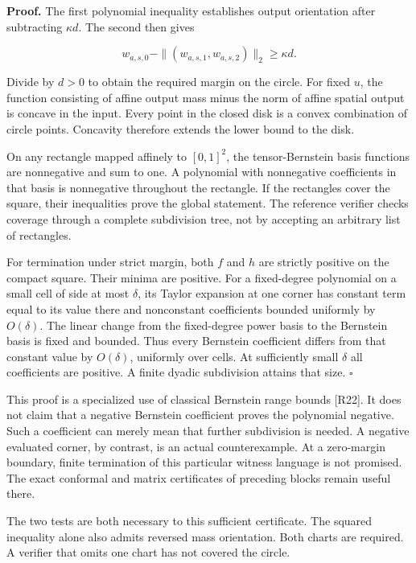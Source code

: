 \documentclass[11pt,letterpaper]{article}
\begin{document}
\textbf{Proof.} The first polynomial inequality establishes output
orientation after subtracting \(\kappa d\). The second then gives

\[
w_{a,s,0}-\|(w_{a,s,1},w_{a,s,2})\|_2\geq\kappa d.
\]

Divide by \(d>0\) to obtain the required margin on the circle. For fixed
\(u\), the function consisting of affine output mass minus the norm of
affine spatial output is concave in the input. Every point in the closed
disk is a convex combination of circle points. Concavity therefore
extends the lower bound to the disk.

On any rectangle mapped affinely to \([0,1]^2\), the tensor-Bernstein
basis functions are nonnegative and sum to one. A polynomial with
nonnegative coefficients in that basis is nonnegative throughout the
rectangle. If the rectangles cover the square, their inequalities prove
the global statement. The reference verifier checks coverage through a
complete subdivision tree, not by accepting an arbitrary list of
rectangles.

For termination under strict margin, both \(f\) and \(h\) are strictly
positive on the compact square. Their minima are positive. For a
fixed-degree polynomial on a small cell of side at most \(\delta\), its
Taylor expansion at one corner has constant term equal to its value
there and nonconstant coefficients bounded uniformly by \(O(\delta)\).
The linear change from the fixed-degree power basis to the Bernstein
basis is fixed and bounded. Thus every Bernstein coefficient differs
from that constant value by \(O(\delta)\), uniformly over cells. At
sufficiently small \(\delta\) all coefficients are positive. A finite
dyadic subdivision attains that size. \(\square\)

This proof is a specialized use of classical Bernstein range bounds
{[}R22{]}. It does not claim that a negative Bernstein coefficient
proves the polynomial negative. Such a coefficient can merely mean that
further subdivision is needed. A negative evaluated corner, by contrast,
is an actual counterexample. At a zero-margin boundary, finite
termination of this particular witness language is not promised. The
exact conformal and matrix certificates of preceding blocks remain
useful there.

The two tests are both necessary to this sufficient certificate. The
squared inequality alone also admits reversed mass orientation. Both
charts are required. A verifier that omits one chart has not covered the
circle.
\end{document}
